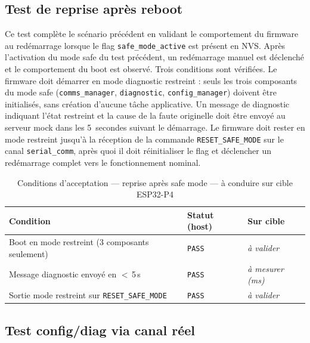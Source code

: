 \subsection{Test de reprise après reboot}
\label{subsec:t_resume}

Ce test complète le scénario précédent en validant le comportement
du firmware au redémarrage lorsque le flag \texttt{safe\_mode\_active}
est présent en NVS. Après l'activation du mode safe du test précédent,
un redémarrage manuel est déclenché et le comportement du boot est
observé. Trois conditions sont vérifiées. Le firmware doit démarrer
en mode diagnostic restreint : seuls les trois composants du mode
safe (\texttt{comms\_manager}, \texttt{diagnostic}, \texttt{config\_manager})
doivent être initialisés, sans création d'aucune tâche applicative.
Un message de diagnostic indiquant l'état restreint et la cause de
la faute originelle doit être envoyé au serveur mock dans les 5~secondes
suivant le démarrage. Le firmware doit rester en mode restreint
jusqu'à la réception de la commande \texttt{RESET\_SAFE\_MODE} sur
le canal \texttt{serial\_comm}, après quoi il doit réinitialiser le
flag et déclencher un redémarrage complet vers le fonctionnement
nominal.

\begin{table}[H]
\centering
\renewcommand{\arraystretch}{1.5}
\caption{Conditions d'acceptation — reprise après safe mode — à conduire sur cible ESP32-P4}
\label{tab:res_resume}
\small
\begin{tabular}{|p{6.2cm}|p{2.0cm}|p{2.8cm}|}
\hline
\rowcolor{gray!20}
\textbf{Condition} & \textbf{Statut (host)} & \textbf{Sur cible} \\
\hline
Boot en mode restreint (3 composants seulement) & \texttt{PASS} & \textit{à valider} \\
\hline
Message diagnostic envoyé en $<$\,5\,s          & \texttt{PASS} & \textit{à mesurer (ms)} \\
\hline
Sortie mode restreint sur \texttt{RESET\_SAFE\_MODE} & \texttt{PASS} & \textit{à valider} \\
\hline
\end{tabular}
\end{table}

\subsection{Test config/diag via canal réel}
\label{subsec:t_canal}

